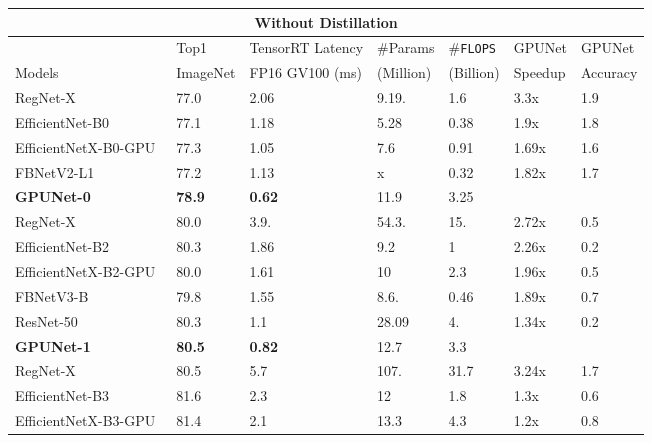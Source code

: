 \documentclass[10pt,twocolumn,letterpaper]{article}
\begin{document}
\begin{table*}[!tb]
\vspace{-0.8cm}
\centering
\begin{threeparttable}
    \small	
    \centering
    \begin{tabular}{l l l l l l l}
          \multicolumn{7}{c}{Without Distillation} \\
          \midrule
          {}     & Top1     & TensorRT Latency &  \#Params & \#{\tt FLOPS} & GPUNet & GPUNet \\
          Models & ImageNet & FP16 GV100 (ms)          & (Million) & (Billion)    & Speedup  & Accuracy \\
          \midrule                                     RegNet-X~\cite{radosavovic2020designing}    & 77.0 & 2.06 & 9.19. & 1.6  & 3.3x   & 1.9 \\
          EfficientNet-B0~\cite{tan2019efficientnet}  & 77.1 & 1.18 & 5.28   & 0.38 & 1.9x  & 1.8 \\
          EfficientNetX-B0-GPU~\cite{li2021searching} & 77.3 & 1.05 & 7.6    & 0.91 & 1.69x & 1.6 \\ 
          FBNetV2-L1~\cite{wan2020fbnetv2}            & 77.2 & 1.13 & x      & 0.32 & 1.82x & 1.7 \\
          \textbf{GPUNet-0} & \textbf{78.9} & \textbf{0.62} & 11.9  & 3.25   &      \\
    	  \midrule                                     RegNet-X                                    & 80.0 & 3.9. & 54.3. & 15.  & 2.72x & 0.5\\
		  EfficientNet-B2                             & 80.3 & 1.86 & 9.2   & 1    & 2.26x & 0.2\\
		  EfficientNetX-B2-GPU                        & 80.0 & 1.61 & 10    & 2.3  & 1.96x & 0.5\\
		  FBNetV3-B~\cite{dai2021fbnetv3}             & 79.8 & 1.55 & 8.6.  & 0.46 & 1.89x & 0.7\\
		  ResNet-50~\cite{he2016deep}                 & 80.3 & 1.1  & 28.09 & 4.   & 1.34x & 0.2\\
		  \textbf{GPUNet-1} & \textbf{80.5} & \textbf{0.82}  & {12.7} & {3.3} & ~    \\ 
		  \midrule
		  RegNet-X                                    & 80.5 & 5.7  & 107.  & 31.7   & 3.24x & 1.7\\
		  EfficientNet-B3                             & 81.6 & 2.3  & 12    & 1.8    & 1.3x  & 0.6\\
		  EfficientNetX-B3-GPU                        & 81.4 & 2.1  & 13.3  & 4.3    & 1.2x  & 0.8\\

\end{tabular}
\end{threeparttable}
\end{table*}
\end{document}
